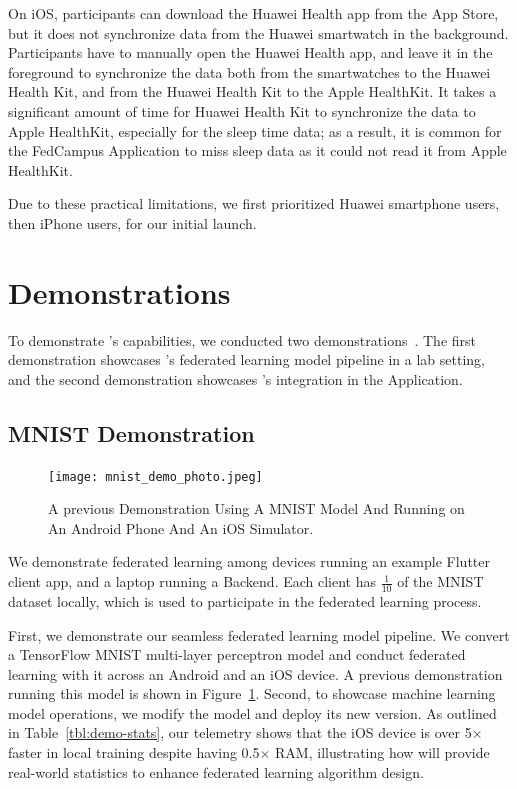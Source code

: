 On iOS, participants can download the Huawei Health app from the App Store,
but it does not synchronize data from the Huawei smartwatch in the background.
Participants have to manually open the Huawei Health app,
and leave it in the foreground to synchronize the data both from
the smartwatches to the Huawei Health Kit,
and from the Huawei Health Kit to the Apple HealthKit.
It takes a significant amount of time for Huawei Health Kit to
synchronize the data to Apple HealthKit,
especially for the sleep time data;
as a result, it is common for the FedCampus Application to miss sleep data as
it could not read it from Apple HealthKit.

Due to these practical limitations,
we first prioritized Huawei smartphone users, then iPhone users,
for our initial launch.

\section{\fedkit Demonstrations}

To demonstrate \fedkit's capabilities,
we conducted two demonstrations~\cite{he2024fedkit}.
The first demonstration showcases \fedkit's federated learning model pipeline in
a lab setting,
and the second demonstration showcases \fedkit's integration in the \fedcampus
Application.

\subsection{\fedkit MNIST Demonstration}

\begin{figure}\begin{center}
        \label{fig:lab}
        \texttt{[image: mnist\_demo\_photo.jpeg]}
        \caption{A previous \fedkit Demonstration Using A MNIST Model And
            Running on An Android Phone And An iOS Simulator.
        }
    \end{center}\end{figure}

We demonstrate federated learning among
devices running an example Flutter client app,
and a laptop running a \fedkit Backend. Each client has $\frac{1}{10}$ of the
MNIST~\cite{cohen2017emnist} dataset locally,
which is used to participate in the federated learning process.

First, we demonstrate our seamless federated learning model pipeline.
We convert a TensorFlow MNIST multi-layer perceptron model and
conduct federated learning with it across an Android and an iOS device.
A previous demonstration running this model is shown in Figure~\ref{fig:lab}.
Second, to showcase machine learning model operations,
we modify the model and deploy its new version.
As outlined in Table~\ref{tbl:demo-stats},
our telemetry shows that
the iOS device is over 5$\times$ faster in local training despite
having 0.5$\times$ RAM,
illustrating how \fedkit will provide real-world statistics to
enhance federated learning algorithm design.

